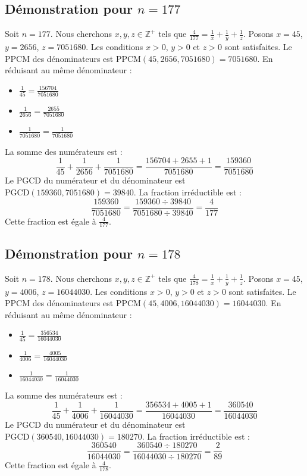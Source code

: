 \documentclass[11pt,a4paper]{article}
\begin{document}
\subsection{Démonstration pour $n = 177$}
Soit $n = 177$. Nous cherchons $x, y, z \in \mathbb{Z}^{+}$ tels que $\frac{4}{177} = \frac{1}{x} + \frac{1}{y} + \frac{1}{z}$.
Posons $x = 45$, $y = 2656$, $z = 7051680$.
Les conditions $x > 0$, $y > 0$ et $z > 0$ sont satisfaites.
Le PPCM des dénominateurs est $\text{PPCM}(45, 2656, 7051680) = 7051680$.
En réduisant au même dénominateur :
\begin{itemize}
    \item $\frac{1}{45} = \frac{156704}{7051680}$
    \item $\frac{1}{2656} = \frac{2655}{7051680}$
    \item $\frac{1}{7051680} = \frac{1}{7051680}$
\end{itemize}
La somme des numérateurs est :
$$ \frac{1}{45} + \frac{1}{2656} + \frac{1}{7051680} = \frac{156704 + 2655 + 1}{7051680} = \frac{159360}{7051680} $$
Le PGCD du numérateur et du dénominateur est $\text{PGCD}(159360, 7051680) = 39840$.
La fraction irréductible est :
$$ \frac{159360}{7051680} = \frac{159360 \div 39840}{7051680 \div 39840} = \frac{4}{177} $$
Cette fraction est égale à $\frac{4}{177}$.

\subsection{Démonstration pour $n = 178$}
Soit $n = 178$. Nous cherchons $x, y, z \in \mathbb{Z}^{+}$ tels que $\frac{4}{178} = \frac{1}{x} + \frac{1}{y} + \frac{1}{z}$.
Posons $x = 45$, $y = 4006$, $z = 16044030$.
Les conditions $x > 0$, $y > 0$ et $z > 0$ sont satisfaites.
Le PPCM des dénominateurs est $\text{PPCM}(45, 4006, 16044030) = 16044030$.
En réduisant au même dénominateur :
\begin{itemize}
    \item $\frac{1}{45} = \frac{356534}{16044030}$
    \item $\frac{1}{4006} = \frac{4005}{16044030}$
    \item $\frac{1}{16044030} = \frac{1}{16044030}$
\end{itemize}
La somme des numérateurs est :
$$ \frac{1}{45} + \frac{1}{4006} + \frac{1}{16044030} = \frac{356534 + 4005 + 1}{16044030} = \frac{360540}{16044030} $$
Le PGCD du numérateur et du dénominateur est $\text{PGCD}(360540, 16044030) = 180270$.
La fraction irréductible est :
$$ \frac{360540}{16044030} = \frac{360540 \div 180270}{16044030 \div 180270} = \frac{2}{89} $$
Cette fraction est égale à $\frac{4}{178}$.
\end{document}

